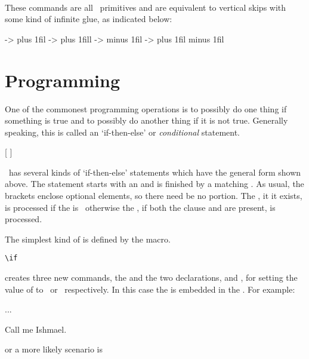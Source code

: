\begin{syntax}
\cmd{\vfil} \cmd{\vfill} \cmd{\vfilneg} \cmd{\vss} \\
\end{syntax}
These commands are all \tx\ primitives and are equivalent to vertical 
skips with some kind of infinite glue, as indicated below:
\begin{lcode}
\vfil     -> \vskip 0pt plus 1fil
\vfill    -> \vskip 0pt plus 1fill
\vfilneg  -> \vskip 0pt           minus 1fil
\vss      -> \vskip 0pt plus 1fil minus 1fil
\end{lcode}



\section{Programming}

    One of the commonest programming operations is to possibly do one thing if
something is true and to possibly do another thing if it is not true. Generally
speaking, this is called an `if-then-else' or
\emph{conditional} statement.

\begin{syntax}
   [   ]  \\
\end{syntax}
\tx\ has several kinds of `if-then-else' statements which have the general
form shown above. The statement starts with an  and is finished
by a matching . As usual, the brackets enclose optional elements, 
so there need be no  portion. The , it it exists,
is processed if the  is \ptrue\ otherwise the 
, if both the  clause and 
are present, is processed.

The simplest kind of 
is defined by the \cmd{\newif} macro.
\begin{syntax}
\cmd{\newif}\verb?\if? \\
\end{syntax}
\cmd{\newif} creates three new commands, the  and the
two declarations,  and , for setting the value
of  to \ptrue\ or \pfalse\ respectively.
In this case the  is embedded in the .
For example:
\begin{lcode}
\newif\ifpeter
...
\ifpeter
  My name is Peter.
\else
  Call me Ishmael.
\fi
\end{lcode}
or a more likely scenario is
\begin{lcode}
\newif\ifmine
  \minetrue %
\newcommand{\whose}{%
  \ifmine It's mine. \else I don't know whose it is. \fi}
\end{lcode}

